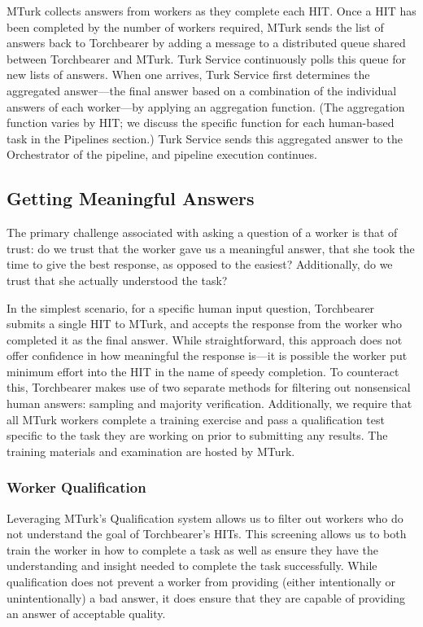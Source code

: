 MTurk collects answers from workers as they complete each HIT. Once a HIT has been completed by the number of workers required, MTurk sends the list of answers back to Torchbearer by adding a message to a distributed queue shared between Torchbearer and MTurk. Turk Service continuously polls this queue for new lists of answers. When one arrives, Turk Service first determines the aggregated answer---the final answer based on a combination of the individual answers of each worker---by applying an aggregation function. (The aggregation function varies by HIT; we discuss the specific function for each human-based task in the Pipelines section.) Turk Service sends this aggregated answer to the Orchestrator of the pipeline, and pipeline execution continues.

\subsection{Getting Meaningful Answers}

The primary challenge associated with asking a question of a worker is that of trust: do we trust that the worker gave us a meaningful answer, that she took the time to give the best response, as opposed to the easiest? Additionally, do we trust that she actually understood the task? 

In the simplest scenario, for a specific human input question, Torchbearer submits a single HIT to MTurk, and accepts the response from the worker who completed it as the final answer. While straightforward, this approach does not offer confidence in how meaningful the response is---it is possible the worker put minimum effort into the HIT in the name of speedy completion. To counteract this, Torchbearer makes use of two separate methods for filtering out nonsensical human answers: sampling and majority verification. Additionally, we require that all MTurk workers complete a training exercise and pass a qualification test specific to the task they are working on prior to submitting any results. The training materials and examination are hosted by MTurk.

\subsubsection{Worker Qualification}

Leveraging MTurk's Qualification system allows us to filter out workers who do not understand the goal of Torchbearer's HITs. This screening allows us to both train the worker in how to complete a task as well as ensure they have the understanding and insight needed to complete the task successfully. While qualification does not prevent a worker from providing (either intentionally or unintentionally) a bad answer, it does ensure that they are capable of providing an answer of acceptable quality.

